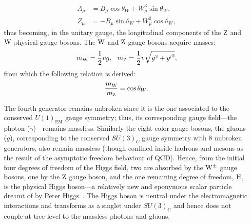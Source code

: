 \begin{align*}
    A_\mu &= B_\mu \cos{\theta_W}  + W^3_\mu \sin{\theta_W},
    \\
    Z_\mu &= -B_\mu \sin{\theta_W}  + W^3_\mu \cos{\theta_W},
\end{align*}
thus becoming, in the unitary gauge, the longitudinal components of the $\text{Z}$ and $\mathrm{W}$ physical gauge bosons. %
The $\mathrm{W}$ and $\text{Z}$ gauge bosons acquire masses:
\begin{equation*}
    m_{\mathrm{W}} = \frac{1}{2}vg, \hspace{7pt} m_{\text{Z}} = \frac{1}{2} v \sqrt{g^2+{g^\prime}^2},
\end{equation*}
from which the following relation is derived:
\begin{equation*}
    \frac{m_{\mathrm{W}}}{m_{\text{Z}}} = \cos{\theta_W}.
\end{equation*}

The fourth generator remains unbroken since it is the one associated to the conserved $U(1)_\text{EM}$ gauge symmetry; thus, its corresponding gauge field---the photon ($\gamma$)---remains massless.
Similarly the eight color gauge bosons, the gluons ($g$), corresponding to the conserved $SU(3)_C$ gauge symmetry with 8 unbroken generators, also remain massless (though confined inside hadrons and mesons as the result of the asymptotic freedom behaviour of QCD).
Hence, from the initial four degrees of freedom of the Higgs field, two are absorbed by the $\mathrm{W}^\pm$ gauge bosons, one by the $\text{Z}$ gauge boson, and the one remaining degree of freedom, $\mathrm{H}$, is the physical Higgs boson---a relatively new and eponymous scalar particle dreamt of by Peter Higgs~\cite{PhysRevLett.13.321,PhysRev.145.1156}.
The Higgs boson is neutral under the electromagnetic interactions and transforms as a singlet under $SU(3)_C$ and hence does not couple at tree level to the massless photons and gluons.

